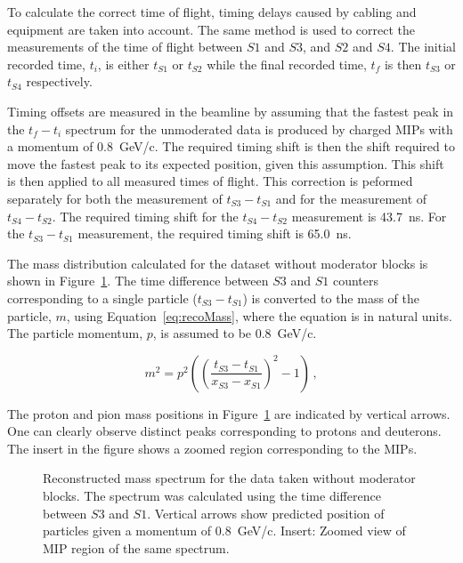 To calculate the correct time of flight, timing delays caused by cabling and equipment are taken into account.
The same method is used to correct the measurements of the time of flight between $\mathit{S1}$ and $\mathit{S3}$, and $\mathit{S2}$ and $\mathit{S4}$.
The initial recorded time, $t_i$, is either $t_{\mathit{S1}}$ or $t_{\mathit{S2}}$ while the final recorded time, $t_f$ is then $t_{\mathit{S3}}$ or $t_{\mathit{S4}}$ respectively.

Timing offsets are measured in the beamline by assuming that the fastest peak in the $t_{f}-t_{i}$ spectrum for the unmoderated data is produced by charged MIPs with a momentum of 0.8~GeV/c.
The required timing shift is then the shift required to move the fastest peak to its expected position, given this assumption.
This shift is then applied to all measured times of flight.
This correction is peformed separately for both the measurement of $t_{\mathit{S3}}-t_{\mathit{S1}}$ and for the measurement of $t_{\mathit{S4}}-t_{\mathit{S2}}$.
The required timing shift for the $t_{\mathit{S4}}-t_{\mathit{S2}}$ measurement is 43.7~ns.
For the $t_{\mathit{S3}}-t_{\mathit{S1}}$ measurement, the required timing shift is 65.0~ns.

The mass distribution calculated for the dataset without moderator blocks is shown in Figure~\ref{fig:s3tof_mass}.
The time difference between $\mathit{S3}$ and $\mathit{S1}$ counters corresponding to a single particle ($t_{\mathit{S3}}-t_{\mathit{S1}}$) is converted to the mass of the particle, $m$, using Equation~\ref{eq:recoMass}, where the equation is in natural units.
The particle momentum, $p$, is assumed to be 0.8~GeV/c.

\begin{equation} 
  m^2 = p^2 \left( 
  \left(\frac{t_{\mathit{S3}}-t_{\mathit{S1}}}{x_{\mathit{S3}}-x_{\mathit{S1}}} \right)^2 - 1  \right) \,,
  \label{eq:recoMass}
\end{equation}

The proton and pion mass positions in Figure~\ref{fig:s3tof_mass} are indicated by vertical arrows.
One can clearly observe distinct peaks corresponding to protons and deuterons. 
The insert in the figure shows a zoomed region corresponding to the MIPs. 

\begin{figure}[h]
  \begin{adjustbox}{max totalsize={\linewidth}, center}
    
  \end{adjustbox}
  \caption{Reconstructed mass spectrum for the data taken without moderator blocks. The spectrum was calculated using the time difference between $\mathit{S3}$ and $\mathit{S1}$. Vertical arrows show predicted position of particles given a momentum of 0.8~GeV/c. Insert: Zoomed view of MIP region of the same spectrum.}
  \label{fig:s3tof_mass}
\end{figure}

